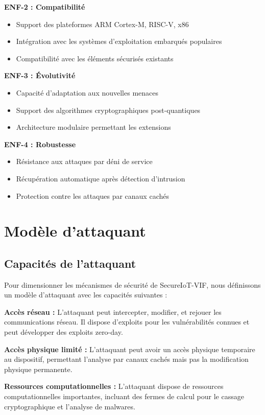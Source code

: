 \textbf{ENF-2 : Compatibilité}
\begin{itemize}
    \item Support des plateformes ARM Cortex-M, RISC-V, x86
    \item Intégration avec les systèmes d'exploitation embarqués populaires
    \item Compatibilité avec les éléments sécurisés existants
\end{itemize}

\textbf{ENF-3 : Évolutivité}
\begin{itemize}
    \item Capacité d'adaptation aux nouvelles menaces
    \item Support des algorithmes cryptographiques post-quantiques
    \item Architecture modulaire permettant les extensions
\end{itemize}

\textbf{ENF-4 : Robustesse}
\begin{itemize}
    \item Résistance aux attaques par déni de service
    \item Récupération automatique après détection d'intrusion
    \item Protection contre les attaques par canaux cachés
\end{itemize}

\section{Modèle d'attaquant}

\subsection{Capacités de l'attaquant}

Pour dimensionner les mécanismes de sécurité de SecureIoT-VIF, nous définissons un modèle d'attaquant avec les capacités suivantes :

\textbf{Accès réseau :} L'attaquant peut intercepter, modifier, et rejouer les communications réseau. Il dispose d'exploits pour les vulnérabilités connues et peut développer des exploits zero-day.

\textbf{Accès physique limité :} L'attaquant peut avoir un accès physique temporaire au dispositif, permettant l'analyse par canaux cachés mais pas la modification physique permanente.

\textbf{Ressources computationnelles :} L'attaquant dispose de ressources computationnelles importantes, incluant des fermes de calcul pour le cassage cryptographique et l'analyse de malwares.


